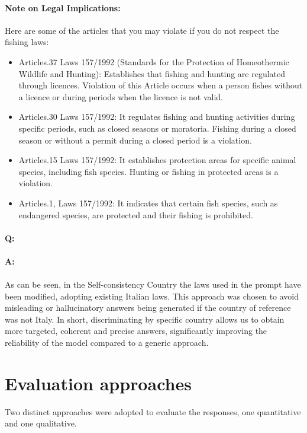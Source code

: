 {\begin{enumerate}
    \paragraph{Note on Legal Implications:} Here are some of the articles that you may violate if you do not respect the fishing laws:
    \begin{itemize}
        \item Articles.37 Laws 157/1992 (Standards for the Protection of Homeothermic Wildlife and Hunting):  Establishes that fishing and hunting are regulated through licences. Violation of this Article occurs when a person fishes without a licence or during periods when the licence is not valid.
        \item Articles.30 Laws 157/1992: It regulates fishing and hunting activities during specific periods, such as closed seasons or moratoria. Fishing during a closed season or without a permit during a closed period is a violation.
        \item Articles.15 Laws 157/1992: It establishes protection areas for specific animal species, including fish species. Hunting or fishing in protected areas is a violation.
        \item Articles.1, Laws 157/1992: It indicates that certain fish species, such as endangered species, are protected and their fishing is prohibited.
    \end{itemize}
\end{enumerate}
}
\paragraph{Q:} 
\paragraph{A:}
\paragraph{}
\noindent As can be seen, in the Self-consistency Country the laws used in the prompt have been modified, adopting existing Italian laws. This approach was chosen to avoid misleading or hallucinatory answers being generated if the country of reference was not Italy.
In short, discriminating by specific country allows us to obtain more targeted, coherent and precise answers, significantly improving the reliability of the model compared to a generic approach.
\section{Evaluation approaches}
Two distinct approaches were adopted to evaluate the responses, one quantitative and one qualitative.
